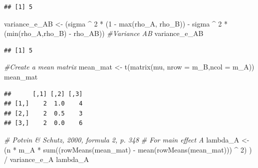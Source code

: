 \documentclass[
]{book}
\newenvironment{Shaded}{\begin{snugshade}}{\end{snugshade}}
\newcommand{\AttributeTok}[1]{\textcolor[rgb]{0.77,0.63,0.00}{#1}}
\newcommand{\CommentTok}[1]{\textcolor[rgb]{0.56,0.35,0.01}{\textit{#1}}}
\newcommand{\DecValTok}[1]{\textcolor[rgb]{0.00,0.00,0.81}{#1}}
\newcommand{\FunctionTok}[1]{\textcolor[rgb]{0.00,0.00,0.00}{#1}}
\newcommand{\NormalTok}[1]{#1}
\newcommand{\OtherTok}[1]{\textcolor[rgb]{0.56,0.35,0.01}{#1}}
\newcommand{\SpecialCharTok}[1]{\textcolor[rgb]{0.00,0.00,0.00}{#1}}
\begin{document}
\begin{verbatim}
## [1] 5
\end{verbatim}

\begin{Shaded}
\begin{Highlighting}[]
\NormalTok{variance\_e\_AB }\OtherTok{\textless{}{-}}
\NormalTok{  (sigma }\SpecialCharTok{\^{}} \DecValTok{2} \SpecialCharTok{*}\NormalTok{ (}\DecValTok{1} \SpecialCharTok{{-}} \FunctionTok{max}\NormalTok{(rho\_A, rho\_B)) }\SpecialCharTok{{-}} 
\NormalTok{     sigma }\SpecialCharTok{\^{}} \DecValTok{2} \SpecialCharTok{*}\NormalTok{ (}\FunctionTok{min}\NormalTok{(rho\_A,rho\_B) }\SpecialCharTok{{-}}\NormalTok{ rho\_AB)) }
\CommentTok{\#Variance AB}
\NormalTok{variance\_e\_AB}
\end{Highlighting}
\end{Shaded}

\begin{verbatim}
## [1] 5
\end{verbatim}

\begin{Shaded}
\begin{Highlighting}[]
\CommentTok{\#Create a mean matrix}
\NormalTok{mean\_mat }\OtherTok{\textless{}{-}} \FunctionTok{t}\NormalTok{(}\FunctionTok{matrix}\NormalTok{(mu, }\AttributeTok{nrow =}\NormalTok{ m\_B,}\AttributeTok{ncol =}\NormalTok{ m\_A)) }
\NormalTok{mean\_mat}
\end{Highlighting}
\end{Shaded}

\begin{verbatim}
##      [,1] [,2] [,3]
## [1,]    2  1.0    4
## [2,]    2  0.5    3
## [3,]    2  0.0    6
\end{verbatim}

\begin{Shaded}
\begin{Highlighting}[]
\CommentTok{\# Potvin \& Schutz, 2000, formula 2, p. 348}
\CommentTok{\# For main effect A}
\NormalTok{lambda\_A }\OtherTok{\textless{}{-}}
\NormalTok{  (n }\SpecialCharTok{*}\NormalTok{ m\_A }\SpecialCharTok{*} \FunctionTok{sum}\NormalTok{((}\FunctionTok{rowMeans}\NormalTok{(mean\_mat) }\SpecialCharTok{{-}} 
                   \FunctionTok{mean}\NormalTok{(}\FunctionTok{rowMeans}\NormalTok{(mean\_mat))) }\SpecialCharTok{\^{}} \DecValTok{2}\NormalTok{) ) }\SpecialCharTok{/}\NormalTok{ variance\_e\_A}
\NormalTok{  lambda\_A}
\end{Highlighting}
\end{Shaded}
\end{document}
